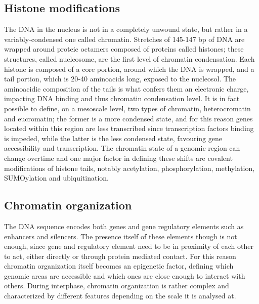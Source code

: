 \subsection{Histone modifications}
The DNA in the nucleus is not in a completely unwound state, but rather in a variably-condensed one called chromatin. Stretches of 145-147 bp of DNA are wrapped around proteic octamers composed of proteins called histones; these structures, called nucleosome, are the first level of chromatin condensation\cite{chromatinstructure2018}. Each histone is composed of a core portion, around which the DNA is wrapped, and a tail portion, which is 20-40 aminoacids long, exposed to the nucleosol. The aminoacidic composition of the tails is what confers them an electronic charge, impacting DNA binding and thus chromatin condensation level. It is in fact possible to define, on a mesoscale level, two types of chromatin, heterocromatin and eucromatin; the former is a more condensed state, and for this reason genes located within this region are less transcribed since transcription factors binding is impeded, while the latter is the less condensed state, favouring gene accessibility and transcription. The chromatin state of a genomic region can change overtime and one major factor in defining these shifts are covalent modifications of histone tails, notably acetylation, phosphorylation, methylation, SUMOylation and ubiquitination\cite{histonemodifications2020}. 

\subsection{Chromatin organization}
The DNA sequence encodes both genes and gene regulatory elements such as enhancers and silencers. The presence itself of these elements though is not enough, since gene and regulatory element need to be in proximity of each other to act, either directly or through protein mediated contact. For this reason chromatin organization itself becomes an epigenetic factor, defining which genomic areas are accessible and which ones are close enough to interact with others. During interphase, chromatin organization is rather complex and characterized by different features depending on the scale it is analysed at\cite{chromatinorganization2019, chromatindevelopment2019}.


